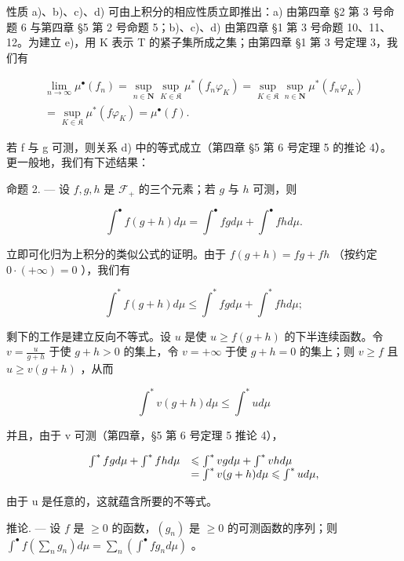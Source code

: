 性质 a)、b)、c)、d) 可由上积分的相应性质立即推出：a) 由第四章 §2 第 3 号命题 6 与第四章 §5 第 2 号命题 5；b)、c)、d) 由第四章 §1 第 3 号命题 10、11、12。为建立 e)，用 K 表示 T 的紧子集所成之集；由第四章 §1 第 3 号定理 3，我们有

\[
\begin{array}{c} \lim _ {n \to \infty} \mu^ {\bullet} (f _ {n}) = \sup _ {n \in \mathbf {N}} \sup _ {K \in \mathfrak {K}} \mu^ {*} (f _ {n} \varphi_ {K}) = \sup _ {K \in \mathfrak {K}} \sup _ {n \in \mathbf {N}} \mu^ {*} (f _ {n} \varphi_ {K}) \\ = \sup _ {K \in \mathfrak {K}} \mu^ {*} (f \varphi_ {K}) = \mu^ {\bullet} (f)  . \end{array}
\]

若 f 与 g 可测，则关系 d) 中的等式成立（第四章 §5 第 6 号定理 5 的推论 4）。更一般地，我们有下述结果：

命题 2. --- 设 \(f,g,h\) 是 \(\mathcal{F}_{+}\) 的三个元素；若 \(g\) 与 \(h\) 可测，则

\[
\int^ {\bullet} f (g + h) d \mu = \int^ {\bullet} f g d \mu + \int^ {\bullet} f h d \mu .\tag{2}
\]

立即可化归为上积分的类似公式的证明。由于 \(f(g + h) = fg + fh\) （按约定 \(0 \cdot (+\infty) = 0\) ），我们有

\[
\int^ {*} f (g + h) d \mu \leqslant \int^ {*} f g d \mu + \int^ {*} f h d \mu ;
\]

剩下的工作是建立反向不等式。设 \(u\) 是使 \(u \geqslant f(g + h)\) 的下半连续函数。令 \(v = \frac{u}{g + h}\) 于使 \(g + h > 0\) 的集上，令 \(v = +\infty\) 于使 \(g + h = 0\) 的集上；则 \(v \geqslant f\) 且 \(u \geqslant v(g + h)\) ，从而

\[
\int^ {*} v (g + h) d \mu \leqslant \int^ {*} u d \mu
\]

并且，由于 v 可测（第四章，§5 第 6 号定理 5 推论 4），

\[
\begin{array}{r l} \int^ {*} f g d \mu + \int^ {*} f h d \mu & \leqslant \int^ {*} v g d \mu + \int^ {*} v h d \mu \\ & = \int^ {*} v (g + h) d \mu \leqslant \int^ {*} u d \mu , \end{array}
\]

由于 u 是任意的，这就蕴含所要的不等式。

推论. --- 设 \(f\) 是 \(\geqslant 0\) 的函数，\((g_n)\) 是 \(\geqslant 0\) 的可测函数的序列；则 \(\int^{\bullet} f\left(\sum_{n} g_n\right) d\mu = \sum_{n} \left(\int^{\bullet} fg_n d\mu\right)\) 。

